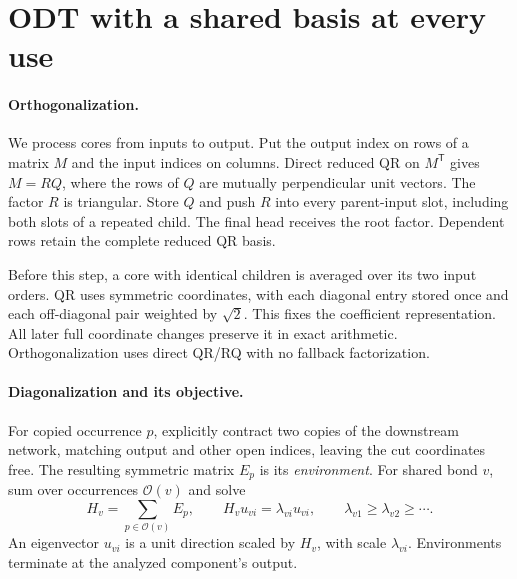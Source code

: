 \documentclass{article}
\begin{document}
\section{ODT with a shared basis at every use}
\label{sec.method}

\paragraph{Orthogonalization.}
We process cores from inputs to output. Put the output index on rows of a matrix $M$ and the input indices on columns. Direct reduced QR on $M^{\mathsf T}$ gives $M=RQ$, where the rows of $Q$ are mutually perpendicular unit vectors. The factor $R$ is triangular. Store $Q$ and push $R$ into every parent-input slot, including both slots of a repeated child. The final head receives the root factor. Dependent rows retain the complete reduced QR basis.

Before this step, a core with identical children is averaged over its two input orders. QR uses symmetric coordinates, with each diagonal entry stored once and each off-diagonal pair weighted by $\sqrt{2}$. This fixes the coefficient representation. All later full coordinate changes preserve it in exact arithmetic. Orthogonalization uses direct QR/RQ with no fallback factorization.

\paragraph{Diagonalization and its objective.}
For copied occurrence $p$, explicitly contract two copies of the downstream network, matching output and other open indices, leaving the cut coordinates free. The resulting symmetric matrix $E_p$ is its \emph{environment}. For shared bond $v$, sum over occurrences $\mathcal O(v)$ and solve
\begin{equation}
 H_v=\sum_{p\in\mathcal O(v)}E_p,\qquad H_vu_{vi}=\lambda_{vi}u_{vi},\qquad
 \lambda_{v1}\ge\lambda_{v2}\ge\cdots.
 \label{eq.environment}
\end{equation}
An eigenvector $u_{vi}$ is a unit direction scaled by $H_v$, with scale $\lambda_{vi}$. Environments terminate at the analyzed component's output.
\end{document}

